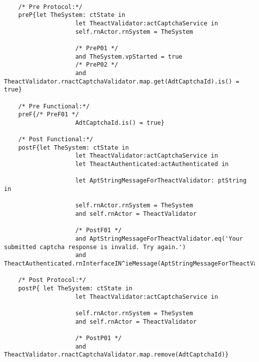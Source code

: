	\scriptsize
	\vspace{0.5cm}
	\begin{lstlisting}[style=MessirStyle,firstnumber=auto,captionpos=b,caption={\msrmessir (MCL-oriented) specification of the operation \emph{oeCaptchaInvalid}.},label=OM-actCaptchaService-oeCaptchaInvalid-MCL-LST]

	/* Pre Protocol:*/ 
	preP{let TheSystem: ctState in
	  				let TheactValidator:actCaptchaService in
					self.rnActor.rnSystem = TheSystem
	  
					/* PreP01 */
					and TheSystem.vpStarted = true
					/* PreP02 */
					and TheactValidator.rnactCaptchaValidator.map.get(AdtCaptchaId).is() = true}
	
	/* Pre Functional:*/
	preF{/* PreF01 */
					AdtCaptchaId.is() = true}
	
	/* Post Functional:*/ 
	postF{let TheSystem: ctState in
					let TheactValidator:actCaptchaService in
					let TheactAuthenticated:actAuthenticated in
					
					let AptStringMessageForTheactValidator: ptString in
					  
					self.rnActor.rnSystem = TheSystem
					and self.rnActor = TheactValidator
					
					/* PostF01 */
					and AptStringMessageForTheactValidator.eq('Your submitted captcha response is invalid. Try again.')
					and TheactAuthenticated.rnInterfaceIN^ieMessage(AptStringMessageForTheactValidator)}
	
	/* Post Protocol:*/ 
	postP{ let TheSystem: ctState in
				  	let TheactValidator:actCaptchaService in
				  
				  	self.rnActor.rnSystem = TheSystem
				  	and self.rnActor = TheactValidator
				  	
				  	/* PostP01 */
					and TheactValidator.rnactCaptchaValidator.map.remove(AdtCaptchaId)}
	
	\end{lstlisting}
	\normalsize 
	
	
	
	





